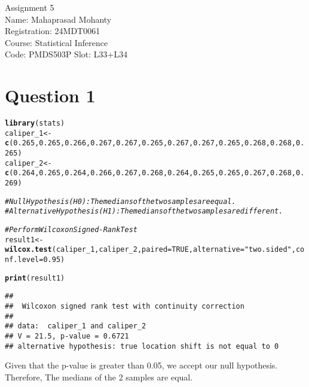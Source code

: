 \documentclass{article}\usepackage[]{graphicx}\usepackage[]{xcolor}
\makeatletter
\newcommand{\hlnum}[1]{\textcolor[rgb]{0.686,0.059,0.569}{#1}}%
\newcommand{\hlsng}[1]{\textcolor[rgb]{0.192,0.494,0.8}{#1}}%
\newcommand{\hlcom}[1]{\textcolor[rgb]{0.678,0.584,0.686}{\textit{#1}}}%
\newcommand{\hldef}[1]{\textcolor[rgb]{0.345,0.345,0.345}{#1}}%
\newcommand{\hlkwb}[1]{\textcolor[rgb]{0.69,0.353,0.396}{#1}}%
\newcommand{\hlkwc}[1]{\textcolor[rgb]{0.333,0.667,0.333}{#1}}%
\newcommand{\hlkwd}[1]{\textcolor[rgb]{0.737,0.353,0.396}{\textbf{#1}}}%
\newenvironment{kframe}{%
 \def\at@end@of@kframe{}%
 \ifinner\ifhmode%
  \def\at@end@of@kframe{\end{minipage}}%
  \begin{minipage}{\columnwidth}%
 \fi\fi%
 \def\FrameCommand##1{\hskip\@totalleftmargin \hskip-\fboxsep
 \colorbox{shadecolor}{##1}\hskip-\fboxsep
     \hskip-\linewidth \hskip-\@totalleftmargin \hskip\columnwidth}%
 \MakeFramed {\advance\hsize-\width
   \@totalleftmargin\z@ \linewidth\hsize
   \@setminipage}}%
 {\par\unskip\endMakeFramed%
 \at@end@of@kframe}
\newenvironment{knitrout}{}{} %
\makeatother
\begin{document}
\begin{center}
Assignment 5 \\
Name: Mahaprasad Mohanty \\
Registration: 24MDT0061 \\
Course: Statistical Inference \\
Code: PMDS503P
Slot: L33+L34
\end{center}

\section{Question 1}
\begin{knitrout}
\color{fgcolor}\begin{kframe}
\begin{alltt}
\hlkwd{library}\hldef{(stats)}
\hldef{caliper_1} \hlkwb{<-} \hlkwd{c}\hldef{(}\hlnum{0.265}\hldef{,} \hlnum{0.265}\hldef{,} \hlnum{0.266}\hldef{,} \hlnum{0.267}\hldef{,} \hlnum{0.267}\hldef{,} \hlnum{0.265}\hldef{,} \hlnum{0.267}\hldef{,} \hlnum{0.267}\hldef{,} \hlnum{0.265}\hldef{,} \hlnum{0.268}\hldef{,} \hlnum{0.268}\hldef{,} \hlnum{0.265}\hldef{)}
\hldef{caliper_2} \hlkwb{<-} \hlkwd{c}\hldef{(}\hlnum{0.264}\hldef{,} \hlnum{0.265}\hldef{,} \hlnum{0.264}\hldef{,} \hlnum{0.266}\hldef{,} \hlnum{0.267}\hldef{,} \hlnum{0.268}\hldef{,} \hlnum{0.264}\hldef{,} \hlnum{0.265}\hldef{,} \hlnum{0.265}\hldef{,} \hlnum{0.267}\hldef{,} \hlnum{0.268}\hldef{,} \hlnum{0.269}\hldef{)}

\hlcom{# Null Hypothesis (H0): The medians of the two samples are equal.}
\hlcom{# Alternative Hypothesis (H1): The medians of the two samples are different.}


\hlcom{# Perform Wilcoxon Signed-Rank Test}
\hldef{result1} \hlkwb{<-} \hlkwd{wilcox.test}\hldef{(caliper_1, caliper_2,} \hlkwc{paired} \hldef{=} \hlnum{TRUE}\hldef{,} \hlkwc{alternative} \hldef{=} \hlsng{"two.sided"}\hldef{,} \hlkwc{conf.level} \hldef{=} \hlnum{0.95}\hldef{)}
\end{alltt}


{\ttfamily\noindent{}}

{\ttfamily\noindent{}}\begin{alltt}
\hlkwd{print}\hldef{(result1)}
\end{alltt}
\begin{verbatim}
## 
## 	Wilcoxon signed rank test with continuity correction
## 
## data:  caliper_1 and caliper_2
## V = 21.5, p-value = 0.6721
## alternative hypothesis: true location shift is not equal to 0
\end{verbatim}
\end{kframe}
\end{knitrout}
Given that the p-value is greater than 0.05, we accept our null hypothesis. Therefore, The medians of the 2 samples are equal.
\end{document}
